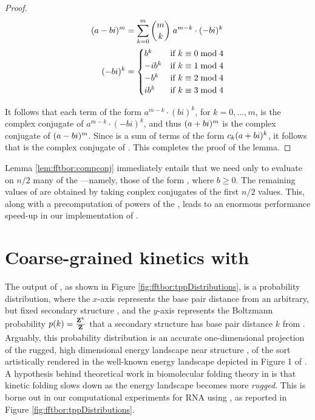 \begin{proof}
\begin{align}
\begin{split}
(a-bi)^m &= \sum_{k=0}^m {m \choose k}\; a^{m-k} \cdot (-bi)^k \\
(-bi)^k &=
\begin{cases}
b^k   & \text{if $k \equiv 0 \bmod 4$} \\
-ib^k & \text{if $k \equiv 1 \bmod 4$} \\
-b^k  & \text{if $k \equiv 2 \bmod 4$} \\
ib^k  & \text{if $k \equiv 3 \bmod 4$} \\
\end{cases}
\end{split}
\end{align}

It follows that each term of the form
$a^{m-k} \cdot (bi)^k$, for $k=0,\dots,m$, is the complex conjugate of
$a^{m-k} \cdot (-bi)^k$, and thus $(a+bi)^m$ is the complex conjugate of
$(a-bi)^m$. Since \emZof{}{\aPbi} is a sum of terms of the form $c_k (a+bi)^k$,
it follows that \emZof{}{\aMbi} is the complex conjugate of \emZof{}{\aPbi}.
This completes the proof of the lemma.

\end{proof}

Lemma \ref{lem:fftbor:compconj} immediately entails that we need only to evaluate \emZ{} on $n/2$
many of the \nRoUs---namely, those of the form
\aPbi, where $b \geq 0$. The remaining values of \emZ{} are obtained by
taking conplex conjugates of the first $n/2$ values. This, along with a
precomputation of powers of the \nRoUs, leads to an
enormous performance speed-up in our implementation of \fftbor.

\section{Coarse-grained kinetics with \fftbor}
\label{sec:fftbor:kinetics}

The output of \fftbor, as shown in Figure
\ref{fig:fftbor:tppDistributions}, is a probability distribution,
where the $x$-axis represents the base pair distance from an arbitrary,
but fixed secondary structure \strSt, and the $y$-axis represents the
Boltzmann probability $p(k) = \frac{{\bf Z}^{k}_{}}{{\bf Z}^{}_{}}$ that a secondary structure
has base pair distance $k$ from \strSt. Arguably, this probability distribution
is an accurate one-dimensional projection of the rugged, high dimensional energy
landscape near structure \strSt,
of the sort artistically rendered in the well-known
energy landscape depicted in Figure 1 of \cite{Wolynes.ptam05}.
A hypothesis behind theoretical work in biomolecular folding theory in
\cite{Bryngelson.p95}
is that kinetic folding slows down as the energy landscape becomes more
{\em rugged}. This is borne out in our computational experiments for RNA
using \fftbor, as reported
in Figure \ref{fig:fftbor:tppDistributions}.

